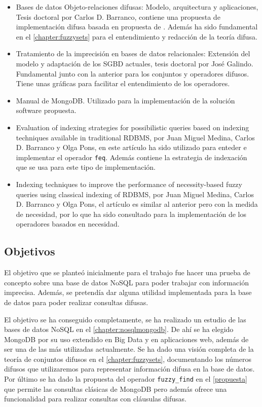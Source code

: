 \begin{itemize}
    \item Bases de datos Objeto-relaciones difusas: Modelo, arquitectura y aplicaciones, Tesis doctoral por Carlos D. Barranco, contiene una propuesta de implementación difusa basada en propuesta de \cite{tesismedina}. Además ha sido fundamental en el \autoref{chapter:fuzzysets} para el entendimiento y redacción de la teoría difusa.
    \item Tratamiento de la imprecisión en bases de datos relacionales: Extensión del modelo y adaptación de los SGBD actuales, tesis doctoral por José Galindo. Fundamental junto con la anterior para los conjuntos y operadores difusos. Tiene unas gráficas para facilitar el entendimiento de los operadores.
    \item Manual de MongoDB. Utilizado para la implementación de la solución software propuesta.
    \item Evaluation of indexing strategies for possibilistic queries based on indexing techniques available in traditional RDBMS, por Juan Miguel Medina, Carlos D. Barranco y Olga Pons, en este artículo ha sido utilizado para enteder e implementar el operador \texttt{feq}. Además contiene la estrategia de indexación que se usa para este tipo de implementación.
    \item Indexing techniques to improve the performance of necessity-based fuzzy queries using classical indexing of RDBMS, por Juan Miguel Medina, Carlos D. Barranco y Olga Pons, el artículo es similar al anterior pero con la medida de necesidad, por lo que ha sido consultado para la implementación de los operadores basados en necesidad.
\end{itemize}


\subsection{Objetivos}

El objetivo que se planteó inicialmente para el trabajo fue hacer una prueba de concepto sobre una base de datos NoSQL para poder trabajar con información imprecisa. Además, se pretendía dar alguna utilidad implementada para la base de datos para poder realizar consultas difusas.

El objetivo se ha conseguido completamente, se ha realizado un estudio de las bases de datos NoSQL en el \autoref{chapter:nosqlmongodb}. De ahí se ha elegido MongoDB por su uso extendido en Big Data y en aplicaciones web, además de ser una de las más utilizadas actualmente. Se ha dado una visión completa de la teoría de conjuntos difusos en el \autoref{chapter:fuzzysets}, documentando los números difusos que utilizaremos para representar información difusa en la base de datos. Por último se ha dado la propuesta del operador \texttt{fuzzy\_find} en el \autoref{propuesta} que permite las consultas clásicas de MongoDB pero además ofrece una funcionalidad para realizar consultas con cláusulas difusas.

